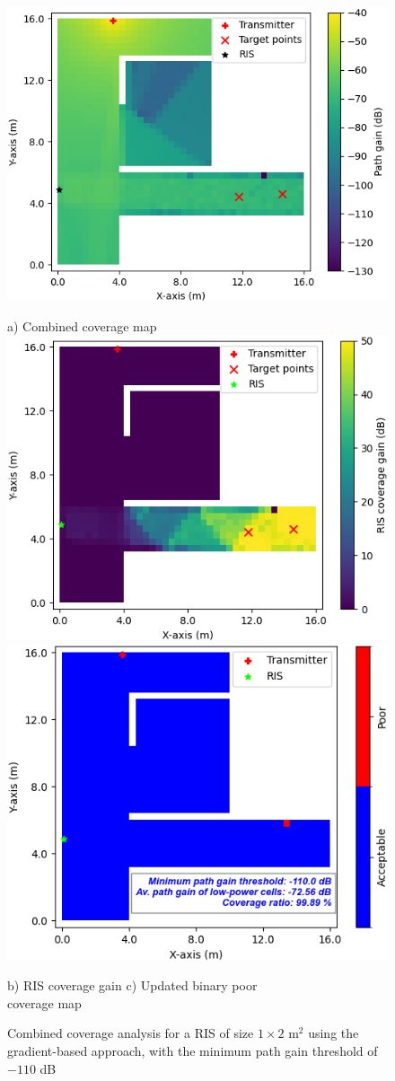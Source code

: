 \documentclass{IEEEoj}
\begin{document}
\begin{figure}
	\centering
	\includegraphics[width=0.8\linewidth]{Sim_Results/Comb_cov_1x2_Gradient_-110dB.png}
	
	a) Combined coverage map \\[5pt]
	
	\includegraphics[width=0.49\linewidth]{Sim_Results/RIS_cov_gain_1x2_Gradient_-110dB.png}
	\hfill
	\includegraphics[width=0.48\linewidth]{Sim_Results/New_Binary_Cov_Map_1x2_Gradient_-110dB.png}
	
	\hspace{10pt} b) RIS coverage gain \hspace{30pt} c) Updated binary poor \\ \hspace{140pt} coverage map
	\caption{Combined coverage analysis for a RIS of size $1 \times 2$ m$^2$ using the gradient-based approach, with the minimum path gain threshold of $-110$ dB}
	\label{comb_cov_gradient_-110dB}
\end{figure}
\end{document}
